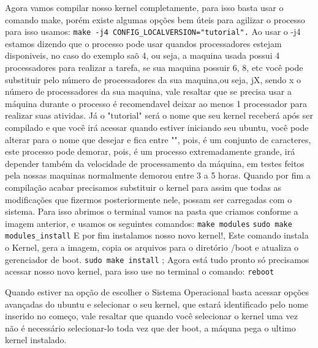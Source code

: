 \documentclass[12pt]{article}
\begin{document}
	Agora vamos compilar nosso kernel completamente, para isso basta usar o comando make, porém existe algumas opções bem úteis para agilizar o processo para isso usamos: \newline
	\verb!make -­j4 CONFIG_LOCALVERSION="tutorial".! \newline
	Ao usar o -j4 estamos dizendo que o processo pode usar quandos processadores estejam disponiveis, no caso do exemplo saõ 4, ou seja, a maquina usada possui 4 processadores para realizar a tarefa, se sua maquina possuir 6, 8, etc você pode substituir pelo número de processadores da sua maquina,ou seja, jX, sendo x o número de processadores da sua maquina, vale resaltar que se precisa usar a máquina durante o processo é recomendavel deixar ao menos 1 processador para realizar suas atividas. Já o "tutorial" será o nome que seu kernel receberá após ser compilado e que você irá acessar quando estiver iniciando seu ubuntu, você pode alterar para o nome que desejar e fica entre "", pois, é um conjunto de caracteres, este processo pode demorar, pois, é um processo extremadamente grande, irá depender também da velocidade de processamento da máquina, em testes feitos pela nossas maquinas normalmente demorou entre 3 a 5 horas.
	\newline
	Quando por fim a compilação acabar precisamos substituir o kernel para assim que todas as modificações que fizermos posteriormente nele, possam ser carregadas com o sistema. Para isso abrimos o terminal vamos na pasta que criamos conforme a imagem anterior, e usamos os seguintes comandos: \newline
	\verb"make modules" \newline
	\verb"sudo make modules_install"\newline
	E por fim instalamos nosso novo kernel!, Este comando instala o Kernel, gera a imagem, copia os arquivos para o diretório /boot e atualiza o gerenciador de boot.\newline
	\verb"sudo make install" \newline;
	Agora está tudo pronto só precisamos acessar nosso novo kernel, para isso use no terminal o comando:\newline
	\verb"reboot" \newline
	
	Quando estiver na opção de escolher o Sistema Operacional basta acessar opções avançadas do ubuntu e selecionar o seu kernel, que estará identificado pelo nome inserido no começo, vale resaltar que quando você selecionar o kernel uma vez não é necessário selecionar-lo toda vez que der boot, a máquna pega o ultimo kernel instalado.
\end{document}
